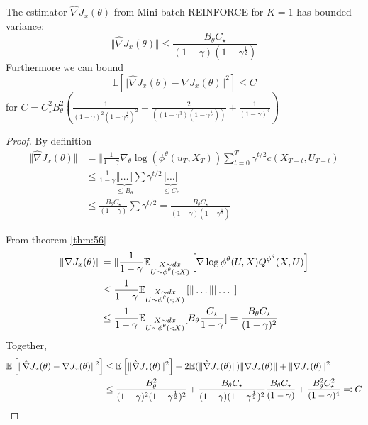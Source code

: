 \begin{lemma}\label{lem:61} %
    The estimator $\hat{\nabla}J_x(\theta)$ from Mini-batch REINFORCE for $K=1$ has bounded variance: 
     \[\Vert \hat{\nabla}J_x(\theta)\Vert \leq \frac{B_\theta C_\star}{(1-\gamma)(1-\gamma^{\frac{1}{2}})}\]
    Furthermore we can bound 
    \[\mathbb{E}\left[\Vert \hat{\nabla}J_x(\theta)-\nabla J_x(\theta)\Vert^2\right]\leq C\]
    for \(C=C_\star^2B_\theta^2\left(\frac{1}{(1-\gamma)^2(1-\gamma^{\frac{1}{2}})^2}+\frac{2}{((1-\gamma^3)(1-\gamma^\frac{1}{2}))}+\frac{1}{(1-\gamma)^4}\right)\)
\end{lemma}
\begin{proof}
    By definition 
    \begin{align*}
        \Vert \hat{\nabla} J_x(\theta)\Vert &= \Vert \frac{1}{1-\gamma}\nabla_\theta \log (\phi^\theta(u_T,X_T))\sum_{t=0}^{T}\gamma^{t/2}c(X_{T-t},U_{T-t})\\
        &\leq \frac{1}{1-\gamma}\underbrace{\Vert \dots \Vert}_{\leq B_\theta} \sum \gamma^{t/2}\underbrace{ |\dots|}_{\leq C_*}\\
        &\leq \frac{B_\theta C_\star}{(1-\gamma)}\sum \gamma^{t/2}=\frac{B_\theta C_\star}{(1-\gamma)(1-\gamma^{\frac{1}{2}})}
    \end{align*}

    From theorem \ref{thm:56}
    \begin{align*}
        \Vert \nabla J_x(\theta)\Vert &=\Vert \frac{1}{1-\gamma}\mathbb{E}_{\substack{X\sim dx\\U\sim \phi^\theta(\cdot;X)}}\left[\nabla\log \phi^\theta(U,X)Q^{\phi^\theta}(X,U)\right]\\
        &\leq \frac{1}{1-\gamma}\mathbb{E}_{\substack{X\sim dx\\U\sim \phi^\theta(\cdot;X)}}\left[\Vert \dots \Vert \vert \dots \vert \right]\\
        &\leq \frac{1}{1-\gamma}\mathbb{E}_{\substack{X\sim dx\\U\sim \phi^\theta(\cdot;X)}}[B_\theta \frac{C_\star}{1-\gamma}]=\frac{B_\theta C_\star}{(1-\gamma)^2}
    \end{align*}
Together, 
\begin{align*}
    \mathbb{E}\left[\Vert \hat{\nabla}J_x(\theta)-\nabla J_x(\theta)\Vert^2\right] & \leq \mathbb{E}\left[\Vert \hat{\nabla}J_x(\theta)\Vert^2\right]+ 2\mathbb{E}(\Vert \hat{\nabla}J_x(\theta)\Vert)\Vert\nabla J_x(\theta)\Vert + \Vert \nabla J_x(\theta)\Vert^2 \\
    &\leq \frac{B_\theta^2}{(1-\gamma)^2(1-\gamma^{\frac{1}{2}})^2}+\frac{B_\theta C_\star}{(1-\gamma)(1-\gamma^{\frac{1}{2}})^2}\frac{B_\theta C_\star}{(1-\gamma)}+\frac{B_\theta^2C_\star^2}{(1-\gamma)^4}\eqqcolon C \qedhere
\end{align*}
\end{proof}

